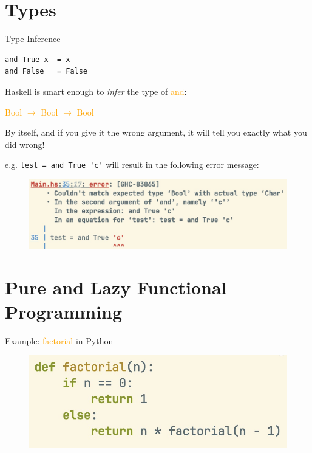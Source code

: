 \documentclass[pdf]{beamer}
\newcommand{\code}[1]{\textcolor{Orange}{\textsf{#1}}}
\begin{document}
\section{Types}
\label{sec:types}

\begin{frame}[fragile]{Type Inference}
\begin{verbatim}
and True x  = x
and False _ = False
\end{verbatim}

  Haskell is smart enough to \textit{infer} the type of \code{and}:

  \code{Bool $\to$ Bool $\to$ Bool}

  By itself, and if you give it the wrong argument, it will tell you exactly what you did wrong!

  e.g. \verb|test = and True 'c'| will result in the following error message:
  \begin{figure}[H]
    \centering
    \includegraphics[width=\linewidth]{and-type-error}
  \end{figure}
\end{frame}



\section{Pure and Lazy Functional Programming}
\label{sec:pure-lazy-fp}

\begin{frame}[fragile]{Example: \code{factorial} in Python}
  \begin{figure}[H]
    \centering
    \includegraphics[width=\linewidth]{factorial-py}
  \end{figure}
\end{frame}
\end{document}
